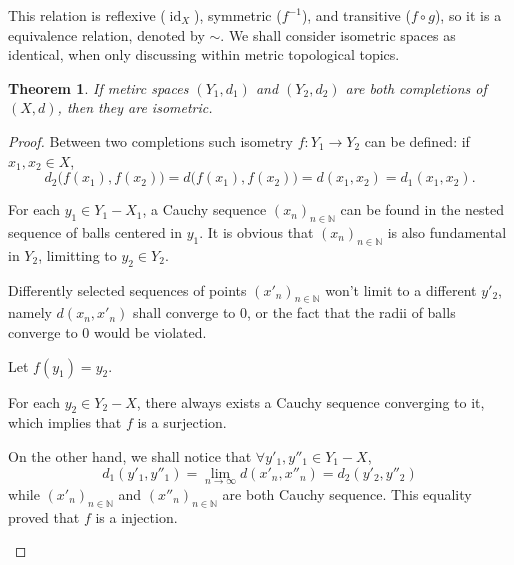 \documentclass[openany]{book}
\theoremstyle{plain}
\newtheorem{theorem}{Theorem}[section] %
\theoremstyle{definition}
\DeclareMathOperator{\id}{id}
\begin{document}
This relation is reflexive ($\id_X$), symmetric ($f^{-1}$), and transitive ($f \circ g$), so it is a equivalence relation, denoted by $\sim$. 
We shall consider isometric spaces as identical, when only discussing within metric topological topics.

\begin{theorem}\label{theorem: completion is unique}
	If metirc spaces $(Y_1, d_1)$ and $(Y_2, d_2)$ are both completions of $(X, d)$, then they are isometric.
\end{theorem}
\begin{proof}
	Between two completions such isometry $f \colon Y_1 \to Y_2$ can be defined: if $x_1, x_2 \in X$, 
	\[
		d_2 \big(f(x_1), f(x_2) \big)
		= d \big(f(x_1), f(x_2) \big) 
		= d(x_1, x_2)
		= d_1 (x_1, x_2).
	\]

	For each $y_1 \in Y_1 - X_1$, a Cauchy sequence $(x_n)_{n \in \mathbb N}$ can be found in the nested sequence of balls centered in $y_1$. 
	It is obvious that $(x_n)_{n \in \mathbb N}$ is also fundamental in $Y_2$, limitting to $y_2\in Y_2$. 
	
	Differently selected sequences of points $(x'_n)_{n \in \mathbb N}$ won't limit to a different $y'_2$, namely $d(x_n, x'_n)$ shall converge to $0$, or the fact that the radii of balls converge to $0$ would be violated. 
	
	Let $f(y_1) = y_2$. 

	\begin{conditionlist}[label=\alph*)]
		\item
		For each $y_2 \in Y_2 - X$, there always exists a Cauchy sequence converging to it, which implies that $f$ is a surjection.
		\item
		On the other hand, we shall notice that $\forall y'_1, y''_1 \in Y_1 - X$,
		\[
			d_1(y'_1, y''_1)= \lim_{n \to \infty} d(x'_n, x''_n)=d_2(y'_2, y''_2)
		\]
		while $(x'_n)_{n \in \mathbb N}$ and $(x''_n)_{n \in \mathbb N}$ are both Cauchy sequence. 
		This equality proved that $f$ is a injection.
	\end{conditionlist}
\end{proof}
\end{document}
